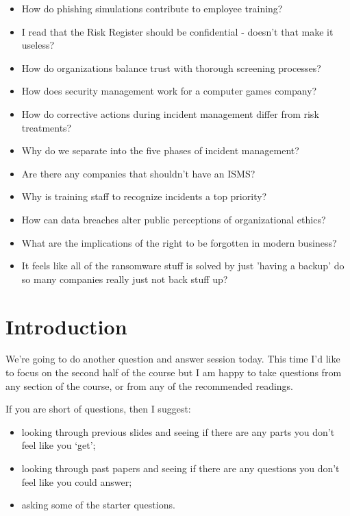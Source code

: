 \documentclass[12pt]{article}
\begin{document}
\begin{itemize}
  \item How do phishing simulations contribute to employee training?
  \item I read that the Risk Register should be confidential - doesn't that make it useless?
  \item How do organizations balance trust with thorough screening processes?
  \item How does security management work for a computer games company?
  \item How do corrective actions during incident management differ from risk treatments?
  \item Why do we separate into the five phases of incident management?
  \item Are there any companies that shouldn't have an ISMS?
  \item Why is training staff to recognize incidents a top priority?
  \item How can data breaches alter public perceptions of organizational ethics?
  \item What are the implications of the right to be forgotten in modern business?
  \item It feels like all of the ransomware stuff is solved by just 'having a backup' do so many companies really just not back stuff up?
\end{itemize}


%
%



\maketitle

\section*{Introduction}
We're going to do another question and answer session today. This time I'd like to focus on the second half of the course but I am happy to take questions from any section of the course, or from any of the recommended readings. 

If you are short of questions, then I suggest: 

\begin{itemize} 
\item looking through previous slides and seeing if there are any parts you don't feel like you `get';
\item looking through past papers and seeing if there are any questions you don't feel like you could answer;
\item asking some of the starter questions.
\end{itemize} 
\end{document}
